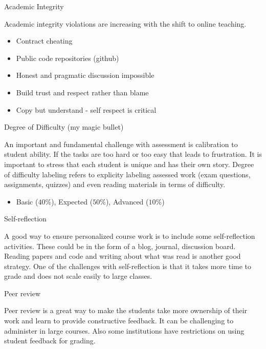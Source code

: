 \documentclass[12pt]{beamer}
\begin{document}
\begin{frame}{Academic Integrity}

  Academic integrity violations are increasing with the shift to online
  teaching.

  \begin{itemize}
  \item{Contract cheating}
  \item{Public code repositories (github)}
  \item{Honest and pragmatic discussion impossible}
  \item{Build trust and respect rather than blame}
  \item{Copy but understand - self respect is critical}
  \end{itemize} 

\end{frame} 

\begin{frame}{Degree of Difficulty (my magic bullet)}

An important and fundamental challenge with assessment is calibration
to student ability. If the tasks are too hard or too easy that
leads to frustration. It is important to stress that each student
is unique and has their own story. Degree of difficulty labeling
refers to explicity labeling assessed work (exam questions, assignments,
quizzes) and even reading materials in terms of difficulty. 

\begin{itemize}
\item{Basic ($40\%$), Expected ($50\%$), Advanced ($10\%$)}
\end{itemize}
  
\end{frame}



\begin{frame}{Self-reflection}

  A good way to ensure personalized course work is to include
  some self-reflection activities. These could be in the form
  of a blog, journal, discussion board. Reading papers and code
  and writing about what was read is another good strategy.
  One of the challenges with self-reflection is that it takes more
  time to grade and does not scale easily to large classes. 
  
\end{frame}

\begin{frame}{Peer review}

  Peer review is a great way to make the students take more ownership of
  their work and learn to provide constructive feedback. It can be challenging
  to administer in large courses. Also some institutions have restrictions on
  using student feedback for grading. 

  
\end{frame}
  
\end{document}
